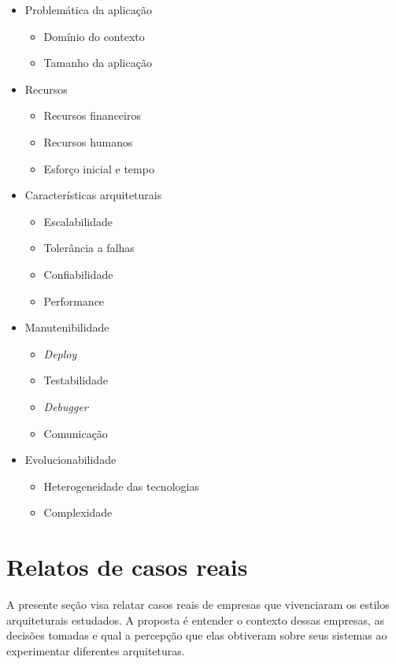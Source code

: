 \begin{itemize}
    \item Problemática da aplicação
        \begin{itemize}
            \item Domínio do contexto
            \item Tamanho da aplicação
        \end{itemize}
    \item Recursos
        \begin{itemize}
            \item Recursos financeiros
            \item Recursos humanos
            \item Esforço inicial e tempo
        \end{itemize}
    \item Características arquiteturais 
        \begin{itemize}
            \item Escalabilidade
            \item Tolerância a falhas
            \item Confiabilidade
            \item Performance
        \end{itemize}
    \item Manutenibilidade
        \begin{itemize}
            \item \textit{Deploy}
            \item Testabilidade
            \item \textit{Debugger}
            \item Comunicação
        \end{itemize}
    \item Evolucionabilidade 
        \begin{itemize}
            \item Heterogeneidade das tecnologias
            \item Complexidade
        \end{itemize}
\end{itemize}

\section{Relatos de casos reais}

A presente seção visa relatar casos reais de empresas que vivenciaram os estilos arquiteturais
estudados. A proposta é entender o contexto dessas empresas, as decisões tomadas e qual a percepção
que elas obtiveram sobre seus sistemas ao experimentar diferentes arquiteturas.

